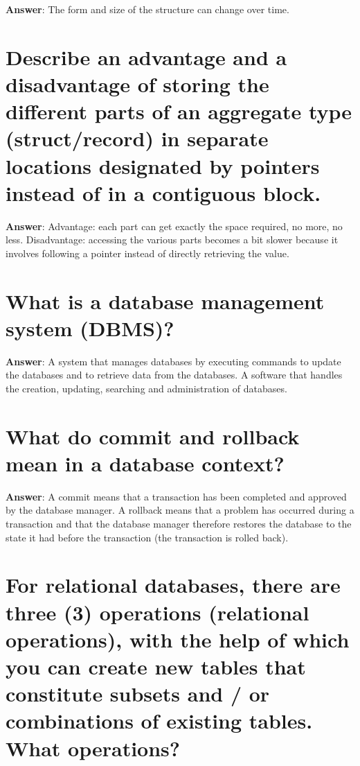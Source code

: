 \documentclass[a4paper,11pt,oneside]{book}
\begin{document}
\begin{sloppypar}
\label{q:275:sa:en:True}

\textbf{Answer}: The form and size of the structure can change over time.



\section{Describe an advantage and a disadvantage of storing the different parts of an aggregate type (struct/record) in separate locations designated by pointers instead of in a contiguous block.}

\label{q:276:sa:en:True}

\textbf{Answer}: Advantage: each part can get exactly the space required, no more, no less. Disadvantage: accessing the various parts becomes a bit slower because it involves following a pointer instead of directly retrieving the value.



\section{What is a database management system (DBMS)?}

\label{q:277:sa:en:True}

\textbf{Answer}: A system that manages databases by executing commands to update the databases and to retrieve data from the databases. A software that handles the creation, updating, searching and administration of databases.



\section{What do commit and rollback mean in a database context?}

\label{q:278:sa:en:True}

\textbf{Answer}: A commit means that a transaction has been completed and approved by the database manager. A rollback means that a problem has occurred during a transaction and that the database manager therefore restores the database to the state it had before the transaction (the transaction is rolled back).



\section{For relational databases, there are three (3) operations (relational operations), with the help of which you can create new tables that constitute subsets and / or combinations of existing tables. What operations?}


\end{sloppypar}
\end{document}
